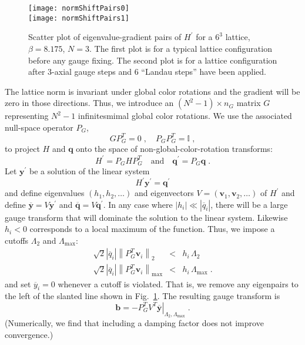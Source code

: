 \documentclass[preprint,aps,prd]{revtex4-2}
\newcommand{\be}{\begin{equation}}
\newcommand{\eq}{\end{equation}}
\newcommand{\heigen}{h}
\begin{document}
\begin{figure}
\texttt{[image: normShiftPairs0]}\\
\texttt{[image: normShiftPairs1]}
\caption{Scatter plot of eigenvalue-gradient pairs of $H^\prime$
  for a $6^3$ lattice, $\beta = 8.175$, $N=3$.
  The first plot is for a typical lattice configuration before any
  gauge fixing.  The second plot is for a lattice configuration
  after 3-axial gauge steps and 6 ``Landau steps'' have been
  applied.
  \label{normShiftPairs}}
\end{figure}

The lattice norm is invariant under global color rotations and
the gradient will be zero in those directions.
Thus, we introduce an $(N^2-1)\times n_G$ matrix $G$
representing $N^2-1$ infinitesmimal global color rotations.
We use the associated null-space operator $P_G$,
\be
G P_G^T = 0 \;, \quad P_G P_G^T = \mathbb{I} \; ,
\eq
to project $H$ and $\mathbf{q}$ onto
the space of non-global-color-rotation transforms:
\be
         H^\prime = P_G H P_G^T \quad \mbox{and} \quad
         \mathbf{q}^\prime = P_G \mathbf{q} \; .
\eq
%
Let $\mathbf{y}^\prime$ be a solution of the linear system
\be
   H^\prime \mathbf{y}^\prime = \mathbf{q}^\prime \label{normlinear2}
\eq
and define eigenvalues
$\left(\heigen_1, \heigen_2, \ldots\right)$ and
eigenvectors $V=\left(\mathbf{v}_1, \mathbf{v}_2, \ldots\right)$
of $H^\prime$ and
define $\overline{\mathbf{y}} = V \mathbf{y}^\prime$ and
$\overline{\mathbf{q}}  = V \mathbf{q}^\prime$.
 In any case where $\left|\heigen_i\right|\ll
\left|\overline{q}_i\right|$,
there will be a large gauge transform that will dominate the solution
to the linear system.
Likewise $\heigen_i<0$ corresponds to a local maximum of the function.
Thus, we impose a cutoffs $\Lambda_2$ and $\Lambda_\mathrm{max}$:
\begin{eqnarray}
    \sqrt{2} \left|\overline{q}_i\right|\left\lVert P_G^T \mathbf{v}_i\right\rVert_2
     &<& \heigen_i \, \Lambda_2 \label{normlambda2}\\
    \sqrt{2} \left|\overline{q}_i\right|
      \left\lVert P_G^T \mathbf{v}_i\right\rVert_\mathrm{max}
    &<& \heigen_i\, \Lambda_\mathrm{max} \; .
\end{eqnarray}
%
and set $\overline{y}_i=0$ whenever a cutoff is violated.
That is, we remove any eigenpairs to the left
of the slanted line shown in Fig.~\ref{normShiftPairs}.
The resulting gauge transform is
\be
      \mathbf{b} = -P_G^T \left. V^T
                    \overline{\mathbf{y}}\right|_{\Lambda_2,\Lambda_\mathrm{max}} \; .
\eq
%
(Numerically, we find that including a damping factor does not
improve convergence.)
\end{document}
